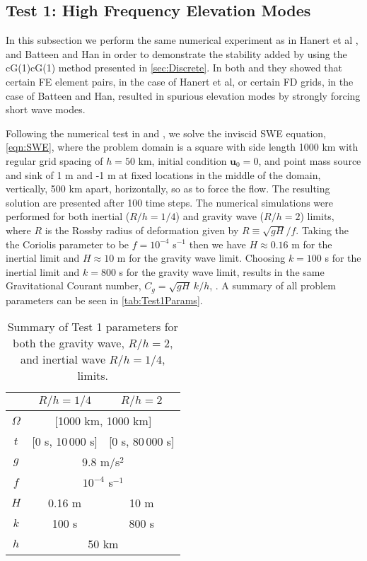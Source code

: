 \subsection{Test 1: High Frequency Elevation Modes} \label{sse:ElevModes}
  In this subsection we perform the same numerical experiment as in Hanert et al
  \cite{Hanert2002}, and Batteen and Han \cite{Batteen1981} in order to
  demonstrate the stability added by using the cG(1)cG(1) method presented in
  \autoref{sec:Discrete}. In both \cite{Hanert2002} and \cite{Batteen1981} they
  showed that certain FE element pairs, in the case of Hanert et al, or certain FD
  grids, in the case of Batteen and Han, resulted in spurious elevation modes by
  strongly forcing short wave modes.

  Following the numerical test in \cite{Hanert2002} and \cite{Batteen1981}, we
  solve the inviscid SWE equation, \eqref{eqn:SWE}, where the problem domain is
  a square with side length 1000 km with regular grid spacing of $h=50$ km,
  initial condition $\mathbf{u}_0 = 0$, and point mass source and sink of 1 m
  and -1 m at fixed locations in the middle of the domain, vertically, 500 km
  apart, horizontally, so as to force the flow.  The resulting solution are
  presented after 100 time steps. The numerical simulations were performed for
  both inertial ($R/h = 1/4$) and gravity wave ($R/h = 2$) limits, where $R$ is
  the Rossby radius of deformation given by $R \equiv \sqrt{gH}/f$. Taking the
  the Coriolis parameter to be $f = 10^{-4}$ s$^{-1}$ then we have $H \approx
  0.16$ m for the inertial limit and $H \approx 10$ m for the gravity wave
  limit. Choosing $k = 100$ s for the inertial limit and $k = 800$ s for the
  gravity wave limit, results in the same Gravitational Courant number, $C_g =
  \sqrt{gH}\,k/h$, \cite{Le-Roux1998}. A summary of all problem parameters can
  be seen in \autoref{tab:Test1Params}.

  \def\arraystretch{1.25} %
  \begin{table}
    \begin{center}
      \begin{tabular}{|c|c|c|}
        \hline
        & $R/h = 1/4$ & $R/h = 2$ \\[0.1em] \hline
        $\Omega$ & \multicolumn{2}{c|}{[1000 km, 1000 km]} \\ \hline
        $t$ & [0 s, 10\,000 s] & [0 s, 80\,000 s] \\ \hline
        $g$ & \multicolumn{2}{c|}{$9.8$ m/s$^2$} \\ \hline 
        $f$ & \multicolumn{2}{c|}{$10^{-4}$ s$^{-1}$} \\ \hline
        $H$ & 0.16 m & 10 m \\ \hline
        $k$ & 100 s & 800 s \\ \hline
        $h$ & \multicolumn{2}{c|}{50 km} \\ \hline
      \end{tabular}
      \caption{Summary of Test 1 parameters for both the gravity wave, $R/h =
      2$, and inertial wave $R/h = 1/4$, limits.}
      \label{tab:Test1Params}
    \end{center}
  \end{table}


